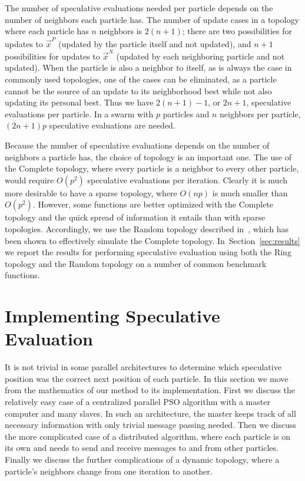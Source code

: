 \documentclass[smallcondensed]{svjour3}
\renewcommand{\sec}[1]{Section~\ref{sec:#1}}
\providecommand{\pers}{\ensuremath{P}}
\providecommand{\neigh}{\ensuremath{N}}
\providecommand{\nbest}{\ensuremath{\Vec{x}^\neigh}}
\providecommand{\pbest}{\ensuremath{\Vec{x}^\pers}}
\begin{document}
The number of speculative evaluations needed per particle depends on the number
of neighbors each particle has.  The number of update cases in a topology where
each particle has $n$ neighbors is $2(n+1)$; there are two possibilities for
updates to $\pbest$ (updated by the particle itself and not updated), and $n+1$
possibilities for updates to $\nbest$ (updated by each neighboring particle and
not updated).  When the particle is also a neighbor to itself, as is always the
case in commonly used topologies, one of the cases can be eliminated, as a
particle cannot be the source of an update to its neighborhood best while not
also updating its personal best.  Thus we have $2(n+1)-1$, or $2n+1$,
speculative evaluations per particle.  In a swarm with $p$ particles and $n$
neighbors per particle, $(2n+1)p$ speculative evaluations are needed.

Because the number of speculative evaluations depends on the number of
neighbors a particle has, the choice of topology is an important one.  The use
of the Complete topology, where every particle is a neighbor to every other
particle, would require $O(p^2)$ speculative evaluations per iteration.
Clearly it is much more desirable to have a sparse topology, where $O(np)$ is
much smaller than $O(p^2)$.  However, some functions are better optimized with
the Complete topology and the quick spread of information it entails than with
sparse topologies.  Accordingly, we use the Random topology described
in~\citep{mcnabb-2009-large-particle-swarms}, which has been shown to
effectively simulate the Complete topology.  In~\sec{results} we report the
results for performing speculative evaluation using both the Ring topology and
the Random topology on a number of common benchmark functions.

\section{Implementing Speculative Evaluation}
\label{sec:implementation}

It is not trivial in some parallel architectures to determine which speculative
position was the correct next position of each particle.  In this section we
move from the mathematics of our method to its implementation.  First we
discuss the relatively easy case of a centralized parallel PSO algorithm with a
master computer and many slaves.  In such an architecture, the master keeps
track of all necessary information with only trivial message passing needed.
Then we discuss the more complicated case of a distributed algorithm, where
each particle is on its own and needs to send and receive messages to and from
other particles.  Finally we discuss the further complications of a dynamic
topology, where a particle's neighbors change from one iteration to another.
\end{document}
